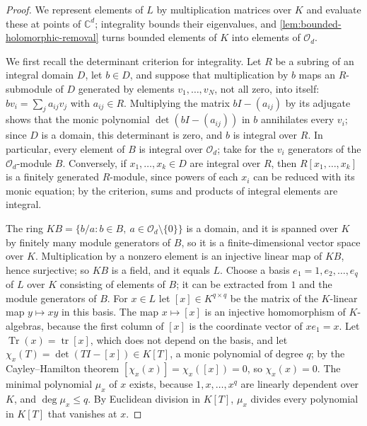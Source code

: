 \begin{proof}
We represent elements of $L$ by multiplication matrices over $K$ and evaluate these at points of $\mathbb C^d$; integrality bounds their eigenvalues, and \cref{lem:bounded-holomorphic-removal} turns bounded elements of $K$ into elements of $\mathcal O_d$.

We first recall the determinant criterion for integrality. Let $R$ be a subring of an integral domain $D$, let $b\in D$, and suppose that multiplication by $b$ maps an $R$-submodule of $D$ generated by elements $v_1,\ldots,v_N$, not all zero, into itself: $bv_i=\sum_ja_{ij}v_j$ with $a_{ij}\in R$. Multiplying the matrix $bI-(a_{ij})$ by its adjugate shows that the monic polynomial $\det(bI-(a_{ij}))$ in $b$ annihilates every $v_i$; since $D$ is a domain, this determinant is zero, and $b$ is integral over $R$. In particular, every element of $B$ is integral over $\mathcal O_d$; take for the $v_i$ generators of the $\mathcal O_d$-module $B$. Conversely, if $x_1,\ldots,x_k\in D$ are integral over $R$, then $R[x_1,\ldots,x_k]$ is a finitely generated $R$-module, since powers of each $x_i$ can be reduced with its monic equation; by the criterion, sums and products of integral elements are integral.

The ring $KB=\{b/a:b\in B,\ a\in\mathcal O_d\setminus\{0\}\}$ is a domain, and it is spanned over $K$ by finitely many module generators of $B$, so it is a finite-dimensional vector space over $K$. Multiplication by a nonzero element is an injective linear map of $KB$, hence surjective; so $KB$ is a field, and it equals $L$. Choose a basis $e_1=1,e_2,\ldots,e_q$ of $L$ over $K$ consisting of elements of $B$; it can be extracted from $1$ and the module generators of $B$. For $x\in L$ let $[x]\in K^{q\times q}$ be the matrix of the $K$-linear map $y\mapsto xy$ in this basis. The map $x\mapsto[x]$ is an injective homomorphism of $K$-algebras, because the first column of $[x]$ is the coordinate vector of $xe_1=x$. Let $\operatorname{Tr}(x)=\operatorname{tr}[x]$, which does not depend on the basis, and let $\chi_x(T)=\det(TI-[x])\in K[T]$, a monic polynomial of degree $q$; by the Cayley--Hamilton theorem $[\chi_x(x)]=\chi_x([x])=0$, so $\chi_x(x)=0$. The minimal polynomial $\mu_x$ of $x$ exists, because $1,x,\ldots,x^q$ are linearly dependent over $K$, and $\deg\mu_x\leq q$. By Euclidean division in $K[T]$, $\mu_x$ divides every polynomial in $K[T]$ that vanishes at $x$.


\end{proof}
